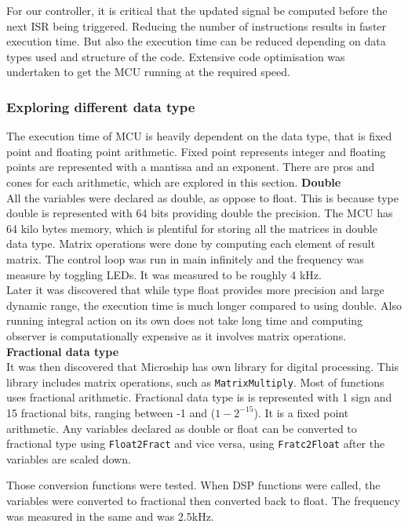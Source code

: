 For our controller, it is critical that the updated signal be computed before the next ISR being triggered. Reducing the number of instructions results in faster execution time. But also the execution time can be reduced depending on data types used and structure of the code. Extensive code optimisation was undertaken to get the MCU running at the required speed. 

\subsubsection{Exploring different data type}
The execution time of MCU is heavily dependent on the data type, that is fixed point and floating point arithmetic. Fixed point represents integer and floating points are represented with a mantissa and an exponent. There are pros and cones for each arithmetic, which are explored in this section. 
\newpar
\textbf{Double}\\
All the variables were declared as double, as oppose to float. This is because type double is represented with 64 bits providing double the precision. The MCU has 64 kilo bytes memory, which is plentiful for storing all the matrices in double data type. 
Matrix operations were done by computing each element of result matrix. The control loop was run in main infinitely and the frequency was measure by toggling LEDs. It was measured to be roughly 4 kHz. \\
Later it was discovered that while type float provides more precision and large dynamic range, the execution time is much longer compared to using double. Also running integral action on its own does not take long time and computing observer is computationally expensive as it involves matrix operations. \\

\textbf{Fractional data type}\\
It was then discovered that Microship has own library for digital processing. This library includes matrix operations, such as \texttt{MatrixMultiply}. Most of functions uses fractional arithmetic. Fractional data type is is represented with 1 sign and 15 fractional bits, ranging between -1 and ($1-2^{-15}$). It is a fixed point arithmetic. Any variables declared as double or float can be converted to fractional type using \texttt{Float2Fract} and vice versa, using \texttt{Fratc2Float} after the variables are scaled down. 

Those conversion functions were tested. When DSP functions were called, the variables were converted to fractional then converted back to float. The frequency was measured in the same and was 2.5kHz. 

